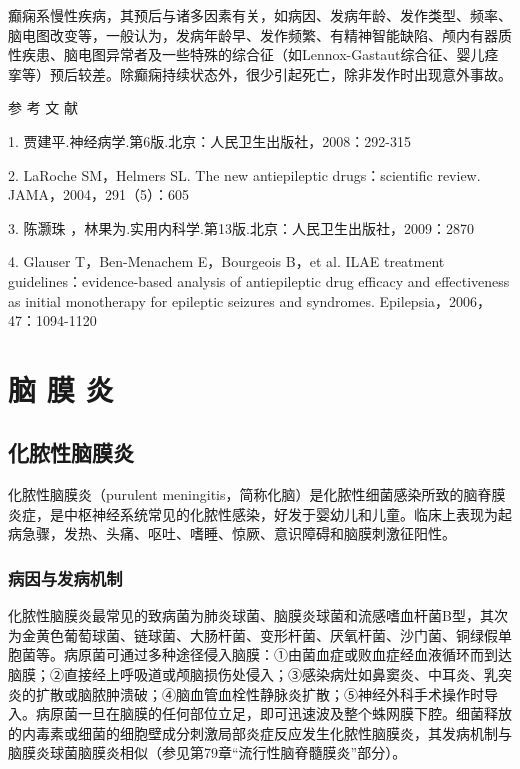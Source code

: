 癫痫系慢性疾病，其预后与诸多因素有关，如病因、发病年龄、发作类型、频率、脑电图改变等，一般认为，发病年龄早、发作频繁、有精神智能缺陷、颅内有器质性疾患、脑电图异常者及一些特殊的综合征（如Lennox-Gastaut综合征、婴儿痉挛等）预后较差。除癫痫持续状态外，很少引起死亡，除非发作时出现意外事故。

\protect\hypertarget{text00246.html}{}{}

\hypertarget{text00246.htmlux5cux23CHP8-2-4}{}
参 考 文 献

1. 贾建平.神经病学.第6版.北京：人民卫生出版社，2008：292-315

2. LaRoche SM，Helmers SL. The new antiepileptic drugs：scientific
review. JAMA，2004，291（5）：605

3. 陈灏珠 ，林果为.实用内科学.第13版.北京：人民卫生出版社，2009：2870

4. Glauser T，Ben-Menachem E，Bourgeois B，et al. ILAE treatment
guidelines：evidence-based analysis of antiepileptic drug efficacy and
effectiveness as initial monotherapy for epileptic seizures and
syndromes. Epilepsia，2006，47：1094-1120

\protect\hypertarget{text00247.html}{}{}

\chapter{脑 膜 炎}

\section{化脓性脑膜炎}

化脓性脑膜炎（purulent
meningitis，简称化脑）是化脓性细菌感染所致的脑脊膜炎症，是中枢神经系统常见的化脓性感染，好发于婴幼儿和儿童。临床上表现为起病急骤，发热、头痛、呕吐、嗜睡、惊厥、意识障碍和脑膜刺激征阳性。

\subsection{病因与发病机制}

化脓性脑膜炎最常见的致病菌为肺炎球菌、脑膜炎球菌和流感嗜血杆菌B型，其次为金黄色葡萄球菌、链球菌、大肠杆菌、变形杆菌、厌氧杆菌、沙门菌、铜绿假单胞菌等。病原菌可通过多种途径侵入脑膜：①由菌血症或败血症经血液循环而到达脑膜；②直接经上呼吸道或颅脑损伤处侵入；③感染病灶如鼻窦炎、中耳炎、乳突炎的扩散或脑脓肿溃破；④脑血管血栓性静脉炎扩散；⑤神经外科手术操作时导入。病原菌一旦在脑膜的任何部位立足，即可迅速波及整个蛛网膜下腔。细菌释放的内毒素或细菌的细胞壁成分刺激局部炎症反应发生化脓性脑膜炎，其发病机制与脑膜炎球菌脑膜炎相似（参见第79章“流行性脑脊髓膜炎”部分）。

